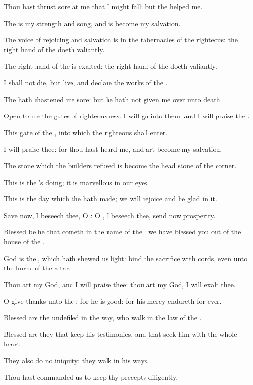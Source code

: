 \Verse Thou hast thrust sore at me that I might fall: but the \LORD helped me.

\Verse The \LORD is my strength and song, and is become my salvation.

\Verse The voice of rejoicing and salvation is in the tabernacles of the righteous: the right hand of the \LORD doeth valiantly.

\Verse The right hand of the \LORD is exalted: the right hand of the \LORD doeth valiantly.

\Verse I shall not die, but live, and declare the works of the \LORD.

\Verse The \LORD hath chastened me sore: but he hath not given me over unto death.

\Verse Open to me the gates of righteousness: I will go into them, and I will praise the \LORD:

\Verse This gate of the \LORD, into which the righteous shall enter.

\Verse I will praise thee: for thou hast heard me, and art become my salvation.

\Verse The stone which the builders refused is become the head stone of the corner.

\Verse This is the \LORD's doing; it is marvellous in our eyes.

\Verse This is the day which the \LORD hath made; we will rejoice and be glad in it.

\Verse Save now, I beseech thee, O \LORD: O \LORD, I beseech thee, send now prosperity.

\Verse Blessed be he that cometh in the name of the \LORD: we have blessed you out of the house of the \LORD.

\Verse God is the \LORD, which hath shewed us light: bind the sacrifice with cords, even unto the horns of the altar.

\Verse Thou art my God, and I will praise thee: thou art my God, I will exalt thee.

\Verse O give thanks unto the \LORD; for he is good: for his mercy endureth for ever.




\Chapter
\Verse Blessed are the undefiled in the way, who walk in the law of the \LORD.

\Verse Blessed are they that keep his testimonies, and that seek him with the whole heart.

\Verse They also do no iniquity: they walk in his ways.

\Verse Thou hast commanded us to keep thy precepts diligently.

